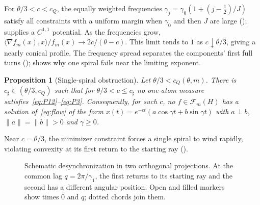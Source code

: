 \documentclass[11pt]{article}
\newtheorem{proposition}[theorem]{Proposition}
\theoremstyle{definition}
\theoremstyle{remark}
\newcommand{\cF}{\mathcal F}
\newcommand{\ip}[2]{\langle #1,#2\rangle}
\newcommand{\norm}[1]{\lVert #1\rVert}
\newcommand{\cQ}{c_{Q}}
\newcommand{\cFm}{\cF_m}
\begin{document}
For \(\theta/3<c<\cQ\), the equally weighted frequencies
\(\gamma_j=\gamma_0(1+(j-\tfrac12)/J)\) satisfy all constraints with a uniform
margin when \(\gamma_0\) and then \(J\) are large ();
 supplies a \(C^{1,1}\) potential.
As the frequencies grow, \(\ip{\nabla f_m(x)}x/f_m(x)\to2c/(\theta-c)\).
This limit tends to \(1\) as \(c\downarrow\theta/3\), giving a nearly conical
profile.  The frequency spread separates the components' first full turns
();
 shows why one spiral fails near the limiting exponent.

\begin{proposition}[Single-spiral obstruction]\label{prop:one}
Let \(\theta/3<\cQ(\theta,m)\).  There is \(c_\sharp\in(\theta/3,\cQ)\) such that for \(\theta/3<c\le c_\sharp\)
no one-atom measure satisfies~\eqref{eq:P12}--\eqref{eq:P3}.  Consequently, for such \(c\), no
\(f\in\cFm(H)\) has a solution of~\eqref{eq:flow} of the form \(x(t)=e^{-ct}(a\cos\gamma t+b\sin\gamma t)\) with
\(a\perp b\), \(\norm a=\norm b>0\) and \(\gamma\ge0\).
\end{proposition}

Near \(c=\theta/3\), the minimizer constraint forces a single spiral to wind
rapidly, violating convexity at its first return to the starting ray ().

\begin{figure}[t]
\centering
{}
\caption{Schematic desynchronization in two orthogonal projections.
At the common lag \(q=2\pi/\gamma_1\), the first returns to its starting ray
and the second has a different angular position.  Open and filled markers
show times \(0\) and \(q\); dotted chords join them.}
\label{fig:spiral-mechanism}
\end{figure}
\end{document}
